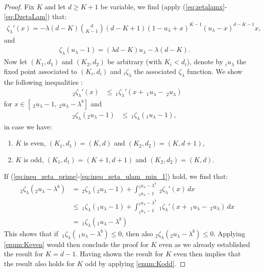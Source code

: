 \documentclass[12pt]{report}
\begin{document}
\begin{proof}
Fix $K$ and let $d \geq K+1$ be variable, we find (apply (\ref{eq:zetalamx}-\ref{eq:DzetaLam}) that:
\begin{align*}
\zeta_\lambda'(x)= - \lambda(d-K) \binom{d}{K-1} (d-K+1) (1-u_\lambda+x)^{K-1}(u_\lambda-x)^{d-K-1} x,
\end{align*}
and
\begin{align}\label{eq:zeta(ulam-1)}
\zeta_\lambda(u_\lambda-1)=(\lambda d - K) u_\lambda - \lambda (d-K).&
\end{align}
Now let $(K_1,d_1)$ and $(K_2,d_2)$ be arbitrary (with $K_i < d_i$), denote by $_i u _\lambda$ the fixed point associated to $(K_i,d_i)$ and $_i\zeta_\lambda$ the associated $\zeta_\lambda$ function. We show the following inequalities :
\begin{align}\label{eq:ineq_zeta_prime}
_2 \zeta _\lambda'(x) & \leq\  _1\zeta _\lambda'(x+\ _1u_\lambda -\ _2u_\lambda) 
\end{align}
for  $x \in [\ _2u_\lambda - 1,\ _2u_\lambda-\lambda^b]$ and
\begin{align}
_2\zeta_\lambda(_2 u _\lambda - 1) &\leq\ _1\zeta _\lambda(_1 u _\lambda - 1), & \label{eq:ineq_zeta_ulam_min_1}
\end{align}
in case we have:
\begin{enumerate}[label=(\roman*),topsep=0pt]
\item \label{enum:Keven} $K$ is even, $(K_1,d_1)=(K,d)$ and $(K_2,d_2)=(K,d+1)$,
\item \label{enum:Kodd} $K$ is odd, $(K_1,d_1)=(K+1,d+1)$ and $(K_2,d_2)=(K,d)$.
\end{enumerate}
If (\ref{eq:ineq_zeta_prime}-\ref{eq:ineq_zeta_ulam_min_1}) hold, we find that:
\begin{align*}
_2\zeta_\lambda(_2u_\lambda-\lambda^b)
&=\ _2\zeta_\lambda( _2u_\lambda-1)+\int_{_2 u_\lambda-1}^{_2 u_\lambda-\lambda^b} \ _2 \zeta_\lambda'(x)\, dx\\
&\leq\ _1 \zeta_\lambda(_1u_\lambda-1)+\int_{_2u_\lambda-1}^{_2u_\lambda-\lambda^b} \ _1 \zeta_\lambda'(x+\ _1u_{\lambda} -\ _2u_{\lambda})\, dx\\
&=\ _1 \zeta_\lambda(_1 u_{\lambda} - \lambda^b)
\end{align*}
This shows that if $\ _1 \zeta_\lambda(\ _1 u_{\lambda} - \lambda^b) \leq 0$, then also $_2 \zeta_\lambda(_2u_\lambda-\lambda^b) \leq 0$. Applying \ref{enum:Keven} would then conclude the proof for $K$ even as we already established the result for $K=d-1$. Having shown the result for $K$
even then implies that the result also holds for $K$ odd by applying \ref{enum:Kodd}. 

\end{proof}
\end{document}
